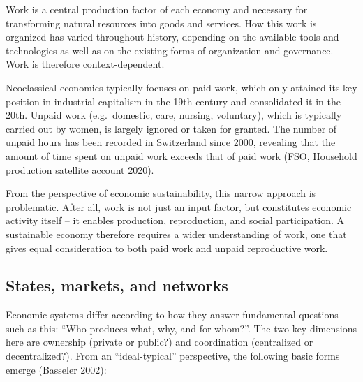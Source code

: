\documentclass[
  a4paper,
  openany]{book}
\begin{document}
\begin{tcolorbox}[enhanced jigsaw, left=2mm, arc=.35mm, titlerule=0mm, opacityback=0, leftrule=.75mm, title={Work is more than paid work}, breakable, bottomtitle=1mm, rightrule=.15mm, coltitle=black, toptitle=1mm, bottomrule=.15mm, colback=white, opacitybacktitle=0.6, colbacktitle=quarto-callout-note-color!10!white, toprule=.15mm, colframe=quarto-callout-note-color-frame]

Work is a central production factor of each economy and necessary for
transforming natural resources into goods and services. How this work is
organized has varied throughout history, depending on the available
tools and technologies as well as on the existing forms of organization
and governance. Work is therefore context-dependent.

Neoclassical economics typically focuses on paid work, which only
attained its key position in industrial capitalism in the 19th century
and consolidated it in the 20th. Unpaid work (e.g.~domestic, care,
nursing, voluntary), which is typically carried out by women, is largely
ignored or taken for granted. The number of unpaid hours has been
recorded in Switzerland since 2000, revealing that the amount of time
spent on unpaid work exceeds that of paid work (FSO, Household
production satellite account 2020).

From the perspective of economic sustainability, this narrow approach is
problematic. After all, work is not just an input factor, but
constitutes economic activity itself -- it enables production,
reproduction, and social participation. A sustainable economy therefore
requires a wider understanding of work, one that gives equal
consideration to both paid work and unpaid reproductive work.

\end{tcolorbox}

\subsection{States, markets, and
networks}\label{states-markets-and-networks}

Economic systems differ according to how they answer fundamental
questions such as this: ``Who produces what, why, and for whom?''. The
two key dimensions here are ownership (private or public?) and
coordination (centralized or decentralized?). From an ``ideal-typical''
perspective, the following basic forms emerge (Basseler 2002):
\end{document}
